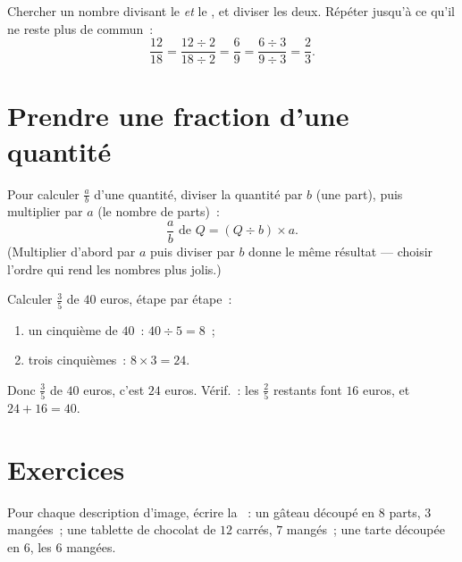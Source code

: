 \begin{method}\label{met:g6:fractions:simplify}
Chercher un nombre divisant le  \emph{et} le ,
et diviser les deux. Répéter jusqu'à ce qu'il ne reste plus de
 commun~:
\[
\frac{12}{18} = \frac{12 \div 2}{18 \div 2} = \frac{6}{9}
= \frac{6 \div 3}{9 \div 3} = \frac{2}{3}.
\]
\end{method}

\section{Prendre une fraction d'une quantité}

\begin{method}\label{met:g6:fractions:ofquantity}
Pour calculer $\frac ab$ d'une quantité, diviser la quantité par $b$
(une part), puis multiplier par $a$ (le nombre de parts)~:
\[
\frac ab \text{ de } Q = (Q \div b) \times a .
\]
(Multiplier d'abord par $a$ puis diviser par $b$ donne le même
résultat --- choisir l'ordre qui rend les nombres plus jolis.)
\end{method}

\begin{example}\label{ex:g6:fractions:ofquantity}
Calculer $\frac35$ de $40$ euros, étape par étape~:
\begin{enumerate}
  \item un cinquième de $40$~: $40 \div 5 = 8$~;
  \item trois cinquièmes~: $8 \times 3 = 24$.
\end{enumerate}
Donc $\frac35$ de $40$ euros, c'est $24$ euros. Vérif.~: les
$\frac25$ restants font $16$ euros, et $24 + 16 = 40$.
\end{example}

\section{Exercices}

\begin{exercise}[$\star$]\label{exo:g6:fractions:1}
Pour chaque description d'image, écrire la ~: un gâteau
découpé en $8$ parts, $3$ mangées~; une tablette de chocolat de
$12$ carrés, $7$ mangés~; une tarte découpée en $6$, les $6$ mangées.
\end{exercise}

